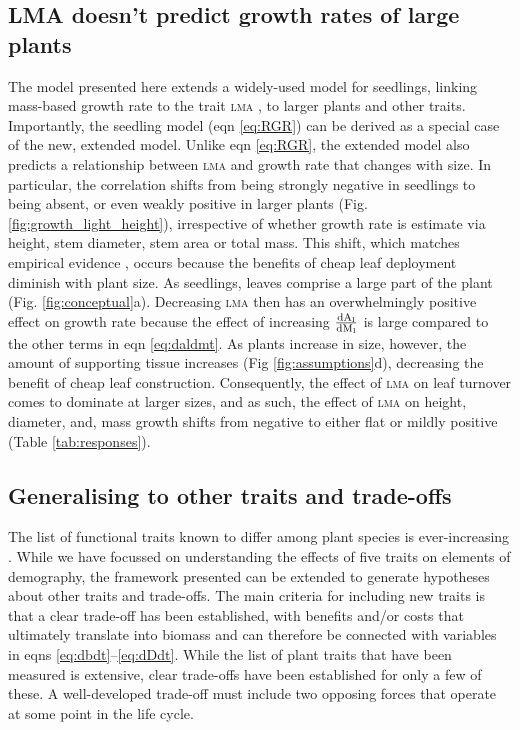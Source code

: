 \documentclass[9pt,twocolumn,twoside,lineno]{pnas-new}
\newcommand{\ud}{\ensuremath{\rm{d}}}
\newcommand{\lma}{\textsc{lma}}
\begin{document}
\subsection*{LMA doesn't predict growth rates of large plants}

The model presented here extends a widely-used model for seedlings, linking mass-based growth rate to the trait {\lma} \citep{Lambers-1992, Wright-2000}, to larger plants and other traits. Importantly, the seedling model (eqn \ref{eq:RGR}) can be derived as a special case of the new, extended model. Unlike eqn \ref{eq:RGR}, the extended model also predicts a relationship between {\lma} and growth rate that changes with size. In particular, the correlation shifts from being strongly negative in seedlings to being absent, or even weakly positive in larger plants (Fig. \ref{fig:growth_light_height}), irrespective of whether growth rate is estimate via height, stem diameter, stem area or total mass. This shift, which matches empirical evidence \citep{Poorter-2008, Wright-2010, Herault-2011, Paine-2015, Gibert-2016}, occurs because the benefits of cheap leaf deployment diminish with plant size. As seedlings, leaves comprise a large part of the plant (Fig. \ref{fig:conceptual}a). Decreasing {\lma} then has an overwhelmingly positive effect on growth rate because the effect of increasing $\frac{\ud A_{\rm l}}{\ud M_{\rm l}}$ is large compared to the other terms in eqn \ref{eq:daldmt}. As plants increase in size, however, the amount of supporting tissue increases (Fig \ref{fig:assumptions}d), decreasing the benefit of cheap leaf construction. Consequently, the effect of {\lma} on leaf turnover comes to dominate at larger sizes, and as such, the effect of {\lma} on height, diameter, and, mass growth shifts from negative to either flat or mildly positive  (Table \ref{tab:responses}).


\subsection*{Generalising to other traits and trade-offs}

The list of functional traits known to differ among plant species is ever-increasing \citep{Perez-2013}. While we have focussed on understanding the effects of five traits on elements of demography, the framework presented can be extended to generate hypotheses about other traits and trade-offs. The main criteria for including new traits is that a clear trade-off has been established, with benefits and/or costs that ultimately translate into biomass and can therefore be connected with variables in eqns \ref{eq:dbdt}--\ref{eq:dDdt}. While the list of plant traits that have been measured is extensive, clear trade-offs have been established for only a few of these. A well-developed trade-off must include two opposing forces that operate at some point in the life cycle.
\end{document}

